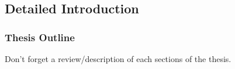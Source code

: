 \subsection{Detailed Introduction}





\subsubsection{Thesis Outline}
Don't forget a review/description of each sections of the thesis.



